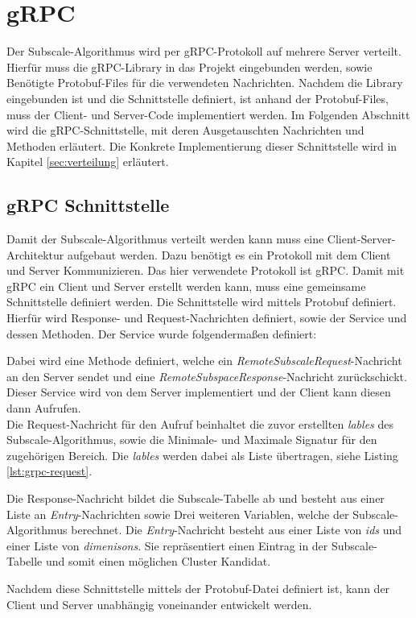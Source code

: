 \section{gRPC}
Der Subscale-Algorithmus wird per gRPC-Protokoll auf mehrere Server verteilt. Hierfür muss die gRPC-Library in das Projekt eingebunden werden, sowie Benötigte Protobuf-Files für die verwendeten Nachrichten. Nachdem die Library eingebunden ist und die Schnittstelle definiert, ist anhand der Protobuf-Files, muss der Client- und Server-Code implementiert werden. Im Folgenden Abschnitt wird die gRPC-Schnittstelle, mit deren Ausgetauschten Nachrichten und Methoden erläutert. Die Konkrete Implementierung dieser Schnittstelle wird in Kapitel \ref{sec:verteilung} erläutert.

\subsection{gRPC Schnittstelle}
\label{sec:grpc}
Damit der Subscale-Algorithmus verteilt werden kann muss eine Client-Server-Architektur aufgebaut werden. Dazu benötigt es ein Protokoll mit dem Client und Server Kommunizieren. Das hier verwendete Protokoll ist gRPC. Damit mit gRPC ein Client und Server erstellt werden kann, muss eine gemeinsame Schnittstelle definiert werden. Die Schnittstelle wird mittels Protobuf definiert. Hierfür wird Response- und Request-Nachrichten definiert, sowie der Service und dessen Methoden. Der Service wurde folgendermaßen definiert:

Dabei wird eine Methode definiert, welche ein \textit{RemoteSubscaleRequest}-Nachricht an den Server sendet und eine \textit{RemoteSubspaceResponse}-Nachricht zurückschickt. Dieser Service wird von dem Server implementiert und der Client kann diesen dann Aufrufen.
\\
Die Request-Nachricht für den Aufruf beinhaltet die zuvor erstellten \textit{lables} des Subscale-Algorithmus, sowie die Minimale- und Maximale Signatur für den zugehörigen Bereich. Die \textit{lables} werden dabei als Liste übertragen, siehe Listing \ref{lst:grpc-request}. 


Die Response-Nachricht bildet die Subscale-Tabelle ab und besteht aus einer Liste an \textit{Entry}-Nachrichten sowie Drei weiteren Variablen, welche der Subscale-Algorithmus berechnet. Die \textit{Entry}-Nachricht besteht aus einer Liste von \textit{ids} und einer Liste von \textit{dimenisons}. Sie repräsentiert einen Eintrag in der Subscale-Tabelle und somit einen möglichen Cluster Kandidat.

Nachdem diese Schnittstelle mittels der Protobuf-Datei definiert ist, kann der Client und Server unabhängig voneinander entwickelt werden.

